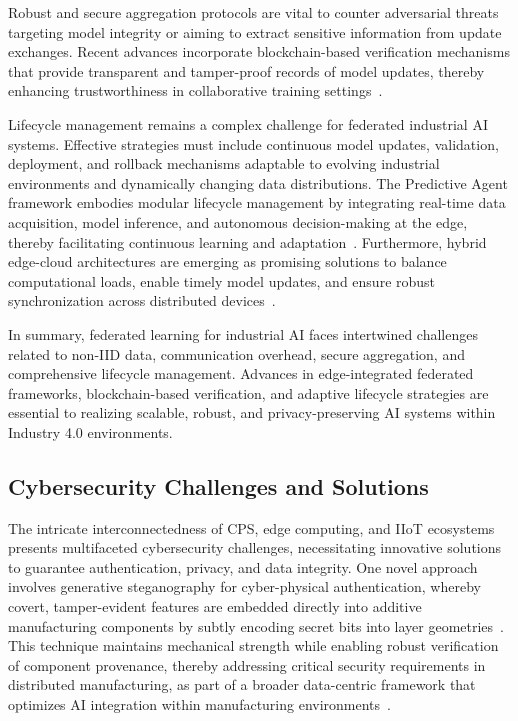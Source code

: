 \documentclass[sigconf]{acmart}
\begin{document}
Robust and secure aggregation protocols are vital to counter adversarial threats targeting model integrity or aiming to extract sensitive information from update exchanges. Recent advances incorporate blockchain-based verification mechanisms that provide transparent and tamper-proof records of model updates, thereby enhancing trustworthiness in collaborative training settings~\cite{ref38}.

Lifecycle management remains a complex challenge for federated industrial AI systems. Effective strategies must include continuous model updates, validation, deployment, and rollback mechanisms adaptable to evolving industrial environments and dynamically changing data distributions. The Predictive Agent framework embodies modular lifecycle management by integrating real-time data acquisition, model inference, and autonomous decision-making at the edge, thereby facilitating continuous learning and adaptation~\cite{ref37}. Furthermore, hybrid edge-cloud architectures are emerging as promising solutions to balance computational loads, enable timely model updates, and ensure robust synchronization across distributed devices~\cite{ref36}.

In summary, federated learning for industrial AI faces intertwined challenges related to non-IID data, communication overhead, secure aggregation, and comprehensive lifecycle management. Advances in edge-integrated federated frameworks, blockchain-based verification, and adaptive lifecycle strategies are essential to realizing scalable, robust, and privacy-preserving AI systems within Industry 4.0 environments.

\subsection{Cybersecurity Challenges and Solutions}

The intricate interconnectedness of CPS, edge computing, and IIoT ecosystems presents multifaceted cybersecurity challenges, necessitating innovative solutions to guarantee authentication, privacy, and data integrity. One novel approach involves generative steganography for cyber-physical authentication, whereby covert, tamper-evident features are embedded directly into additive manufacturing components by subtly encoding secret bits into layer geometries~\cite{ref9}. This technique maintains mechanical strength while enabling robust verification of component provenance, thereby addressing critical security requirements in distributed manufacturing, as part of a broader data-centric framework that optimizes AI integration within manufacturing environments~\cite{ref13}.
\end{document}
